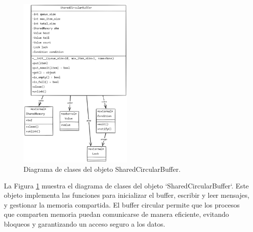 \documentclass[11pt,spanish,listoffigures,listoftables]{tfgetsinf}
\begin{document}
   \begin{figure}[H]
      \centering
      \includegraphics[width=0.5\textwidth]{codigo/images/shared_circular_buffer_uml.png}
      \caption[Diagrama de clases del objeto SharedCircularBuffer]{Diagrama de clases del objeto SharedCircularBuffer.}
      \label{fig:shared_circular_buffer_uml}
   \end{figure}

   La Figura \ref{fig:shared_circular_buffer_uml} muestra el diagrama de clases del objeto `SharedCircularBuffer`. Este objeto implementa las funciones para inicializar el buffer, escribir y leer mensajes, y gestionar la memoria compartida. El buffer circular permite que los procesos que comparten memoria puedan comunicarse de manera eficiente, evitando bloqueos y garantizando un acceso seguro a los datos.

   



\printglossaries
\end{document}
